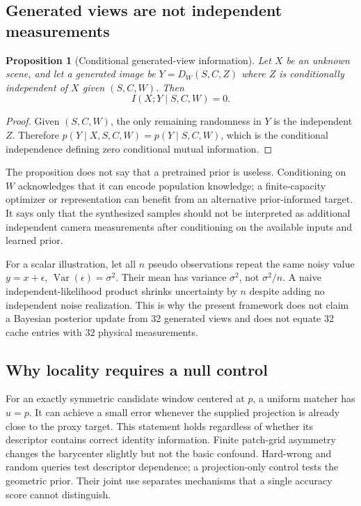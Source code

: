 \documentclass[10pt,twocolumn,letterpaper]{article}
\newtheorem{proposition}{Proposition}
\begin{document}
\subsection{Generated views are not independent measurements}
\begin{proposition}[Conditional generated-view information]
Let $X$ be an unknown scene, and let a generated image be $Y=D_W(S,C,Z)$ where $Z$ is conditionally independent of $X$ given $(S,C,W)$. Then
\begin{equation}
I(X;Y\mid S,C,W)=0.
\end{equation}
\end{proposition}
\begin{proof}
Given $(S,C,W)$, the only remaining randomness in $Y$ is the independent $Z$. Therefore $p(Y\mid X,S,C,W)=p(Y\mid S,C,W)$, which is the conditional independence defining zero conditional mutual information.
\end{proof}
The proposition does not say that a pretrained prior is useless. Conditioning on $W$ acknowledges that it can encode population knowledge; a finite-capacity optimizer or representation can benefit from an alternative prior-informed target. It says only that the synthesized samples should not be interpreted as additional independent camera measurements after conditioning on the available inputs and learned prior.

For a scalar illustration, let all $n$ pseudo observations repeat the same noisy value $y=x+\epsilon$, $\operatorname{Var}(\epsilon)=\sigma^2$. Their mean has variance $\sigma^2$, not $\sigma^2/n$. A naive independent-likelihood product shrinks uncertainty by $n$ despite adding no independent noise realization. This is why the present framework does not claim a Bayesian posterior update from 32 generated views and does not equate 32 cache entries with 32 physical measurements.

\subsection{Why locality requires a null control}
For an exactly symmetric candidate window centered at $p$, a uniform matcher has $\widehat u=p$. It can achieve a small error whenever the supplied projection is already close to the proxy target. This statement holds regardless of whether its descriptor contains correct identity information. Finite patch-grid asymmetry changes the barycenter slightly but not the basic confound. Hard-wrong and random queries test descriptor dependence; a projection-only control tests the geometric prior. Their joint use separates mechanisms that a single accuracy score cannot distinguish.
\end{document}
